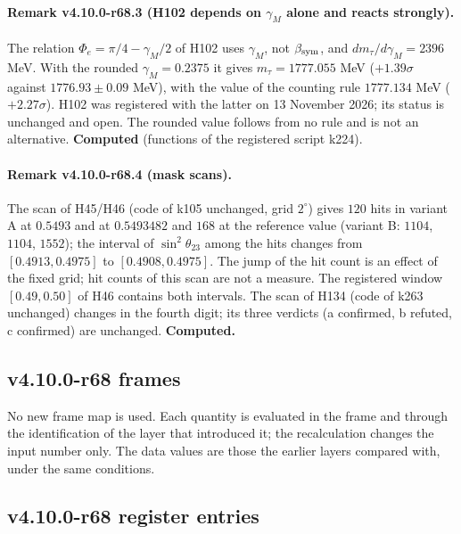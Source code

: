 \paragraph{Remark v4.10.0-r68.3 (H102 depends on \(\gamma_M\) alone and reacts strongly).}
The relation \(\Phi_e=\pi/4-\gamma_M/2\) of H102 uses \(\gamma_M\), not \(\beta_{\rm sym}\), and \(dm_\tau/d\gamma_M=2396\) MeV.  With the
rounded \(\gamma_M=0.2375\) it gives \(m_\tau=1777.055\) MeV (\(+1.39\sigma\) against \(1776.93\pm0.09\) MeV), with the value of the counting
rule \(1777.134\) MeV (\(+2.27\sigma\)).  H102 was registered with the latter on 13 November 2026; its status is unchanged and open.  The
rounded value follows from no rule and is not an alternative.  \textbf{Computed} (functions of the registered script k224).

\paragraph{Remark v4.10.0-r68.4 (mask scans).}
The scan of H45/H46 (code of k105 unchanged, grid \(2^\circ\)) gives \(120\) hits in variant A at \(0.5493\) and at \(0.5493482\) and \(168\)
at the reference value (variant B: \(1104\), \(1104\), \(1552\)); the interval of \(\sin^2\theta_{23}\) among the hits changes from
\([0.4913,0.4975]\) to \([0.4908,0.4975]\).  The jump of the hit count is an effect of the fixed grid; hit counts of this scan are not a
measure.  The registered window \([0.49,0.50]\) of H46 contains both intervals.  The scan of H134 (code of k263 unchanged) changes in the
fourth digit; its three verdicts (a confirmed, b refuted, c confirmed) are unchanged.  \textbf{Computed.}

\subsection*{v4.10.0-r68 frames}
\label{subsec:v4100-r68-frames}

No new frame map is used.  Each quantity is evaluated in the frame and through the identification of the layer that introduced it; the
recalculation changes the input number only.  The data values are those the earlier layers compared with, under the same conditions.

\subsection*{v4.10.0-r68 register entries}
\label{subsec:v4100-r68-register}

